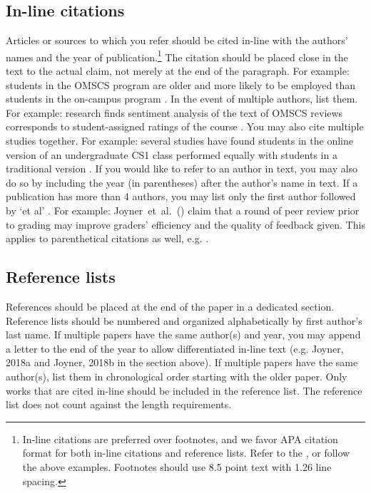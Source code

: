 {{{{\subsection{In-line citations}
Articles or sources to which you refer should be cited in-line with the
authors' names and the year of publication.\footnote{In-line citations are preferred over footnotes, and we favor APA citation format for both in-line citations and reference lists. Refer to the , or follow the above examples. Footnotes should use 8.5 point text with 1.26 line spacing.
} The citation should be placed close
in the text to the actual claim, not merely at the end of the paragraph. For
example: students in the OMSCS program are older and more likely to be employed
than students in the on-campus program \citep{Joyner17}. In the event of
multiple authors, list them. For example: research finds sentiment analysis of
the text of OMSCS reviews corresponds to student-assigned ratings of the course
\citep{Newman18}. You may also cite multiple studies together. For example:
several studies have found students in the online version of an undergraduate
CS1 class performed equally with students in a traditional version
\citep{Joyner18a,Joyner18b,Joyner19}. If you would like to refer to an author in
text, you may also do so by including the year (in parentheses) after the
author's name in text. If a publication has more than 4 authors, you may list
only the first author followed by `et al' . For example:
Joyner~et~al.~(\citeyear{Joyner16}) claim that a round of peer review prior to
grading may improve graders' efficiency and the quality of feedback given. This
applies to parenthetical citations as well, e.g. \citep{Joyner16}.

\subsection{Reference lists}
References should be placed at the end of the paper in a dedicated section. Reference lists should be numbered and organized alphabetically by first author’s last name. If multiple papers have the same author(s) and year, you may append a letter to the end of the year to allow differentiated in-line text (e.g. Joyner, 2018a and Joyner, 2018b in the section above). If multiple papers have the same author(s), list them in chronological order starting with the older paper. Only works that are cited in-line should be included in the reference list. The reference list does not count against the length requirements.

}}}}
